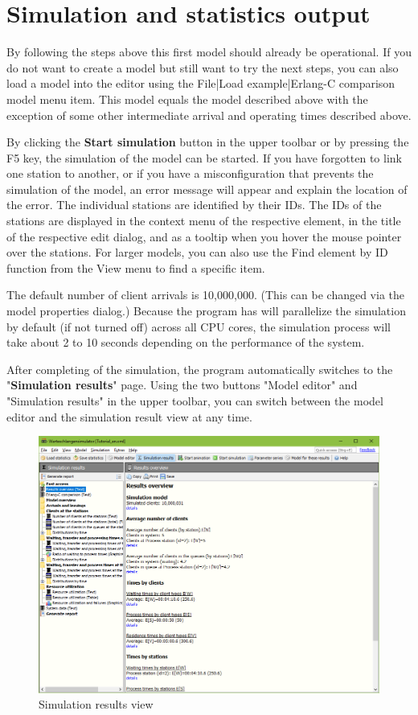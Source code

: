 \documentclass{svmono}
\begin{document}
\chapter{Simulation and statistics output}

By following the steps above this first model should already be operational. If you do not want to create a model but still want to try the next steps, you can also load a model into the editor using the File|Load example|Erlang-C comparison model menu item. This model equals the model described above with the exception of some other intermediate arrival and operating times described above.

By clicking the \textbf{Start simulation} button in the upper toolbar or by pressing the F5 key, the simulation of the model can be started. If you have forgotten to link one station to another, or if you have a misconfiguration that prevents the simulation of the model, an error message will appear and explain the location of the error. The individual stations are identified by their IDs. The IDs of the stations are displayed in the context menu of the respective element, in the title of the respective edit dialog, and as a tooltip when you hover the mouse pointer over the stations. For larger models, you can also use the Find element by ID function from the View menu to find a specific item.

The default number of client arrivals is 10,000,000. (This can be changed via the model properties dialog.) Because the program has will parallelize the simulation by default (if not turned off) across all CPU cores, the simulation process will take about 2 to 10 seconds depending on the performance of the system.

After completing of the simulation, the program automatically switches to the "\textbf{Simulation results}" page. Using the two buttons "Model editor" and "Simulation results" in the upper toolbar, you can switch between the model editor and the simulation result view at any time.

\begin{figure}[H]	
	\caption{Simulation results view}
	\centerline{\includegraphics[width=14cm]{ProgramWindowResults.png}}
	\label{fig:ProgramWindowResults}
\end{figure} 
\end{document}
